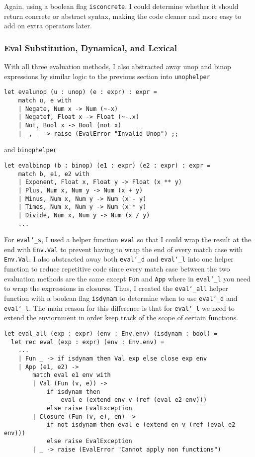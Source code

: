 \documentclass{article}
\begin{document}
Again, using a boolean flag \texttt{isconcrete}, I could determine whether it should return concrete or abstract syntax, making the code cleaner and more easy to add on extra operators later.

\subsubsection{Eval Substitution, Dynamical, and Lexical}

With all three evaluation methods, I also abstracted away unop and binop expressions by similar logic to the previous section into \texttt{unophelper} 

\begin{lstlisting}
let evalunop (u : unop) (e : expr) : expr = 
    match u, e with 
    | Negate, Num x -> Num (~-x)
    | Negatef, Float x -> Float (~-.x)
    | Not, Bool x -> Bool (not x)
    | _, _ -> raise (EvalError "Invalid Unop") ;;
\end{lstlisting}

and \texttt{binophelper}

\begin{lstlisting}
let evalbinop (b : binop) (e1 : expr) (e2 : expr) : expr = 
    match b, e1, e2 with 
    | Exponent, Float x, Float y -> Float (x ** y)
    | Plus, Num x, Num y -> Num (x + y)
    | Minus, Num x, Num y -> Num (x - y)
    | Times, Num x, Num y -> Num (x * y)
    | Divide, Num x, Num y -> Num (x / y)
    ...
\end{lstlisting}

For \texttt{eval\char`_s}, I used a helper function \texttt{eval} so that I could wrap the result at the end with \texttt{Env.Val} to prevent having to wrap the end of every match case with \texttt{Env.Val}. I also abstracted away both \texttt{eval\char`_d} and \texttt{eval\char`_l} into one helper function to reduce repetitive code since every match case between the two evaluation methods are the same except 
\texttt{Fun} and \texttt{App} where in \texttt{eval\char`_l} you need to wrap the expressions in closures. Thus, I created the \texttt{eval\char`_all} helper function with a boolean flag \texttt{isdynam} to determine when to use \texttt{eval\char`_d} and \texttt{eval\char`_l}.
The main reason for this difference is that for \texttt{eval\char`_l} we need to extend the enviornment in order keep track of the scope of certain functions.

\begin{lstlisting}
let eval_all (exp : expr) (env : Env.env) (isdynam : bool) = 
  let rec eval (exp : expr) (env : Env.env) =
    ...
    | Fun _ -> if isdynam then Val exp else close exp env
    | App (e1, e2) -> 
        match eval e1 env with 
        | Val (Fun (v, e)) -> 
            if isdynam then 
                eval e (extend env v (ref (eval e2 env)))
            else raise EvalException
        | Closure (Fun (v, e), en) -> 
            if not isdynam then eval e (extend en v (ref (eval e2 env)))
            else raise EvalException
        | _ -> raise (EvalError "Cannot apply non functions")
\end{lstlisting}
\end{document}

